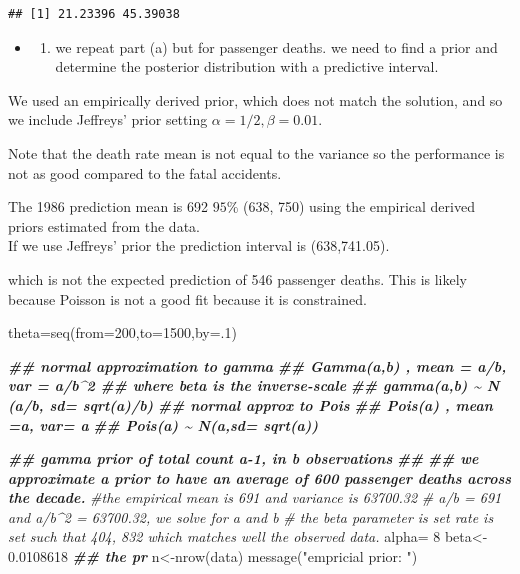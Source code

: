\documentclass[
]{book}
\newenvironment{Shaded}{\begin{snugshade}}{\end{snugshade}}
\newcommand{\AttributeTok}[1]{\textcolor[rgb]{0.77,0.63,0.00}{#1}}
\newcommand{\CommentTok}[1]{\textcolor[rgb]{0.56,0.35,0.01}{\textit{#1}}}
\newcommand{\DecValTok}[1]{\textcolor[rgb]{0.00,0.00,0.81}{#1}}
\newcommand{\DocumentationTok}[1]{\textcolor[rgb]{0.56,0.35,0.01}{\textbf{\textit{#1}}}}
\newcommand{\FloatTok}[1]{\textcolor[rgb]{0.00,0.00,0.81}{#1}}
\newcommand{\FunctionTok}[1]{\textcolor[rgb]{0.00,0.00,0.00}{#1}}
\newcommand{\NormalTok}[1]{#1}
\newcommand{\OtherTok}[1]{\textcolor[rgb]{0.56,0.35,0.01}{#1}}
\newcommand{\StringTok}[1]{\textcolor[rgb]{0.31,0.60,0.02}{#1}}
\providecommand{\tightlist}{%
  \setlength{\itemsep}{0pt}\setlength{\parskip}{0pt}}
\theoremstyle{definition}
\theoremstyle{definition}
\theoremstyle{definition}
\theoremstyle{definition}
\theoremstyle{remark}
\begin{document}
\begin{verbatim}
## [1] 21.23396 45.39038
\end{verbatim}

\begin{itemize}
\item
  \begin{enumerate}
  \def\labelenumi{(\alph{enumi})}
  \setcounter{enumi}{2}
  \tightlist
  \item
    we repeat part (a) but for passenger deaths. we need to find a prior and determine the posterior distribution with a predictive interval.
  \end{enumerate}
\end{itemize}

We used an empirically derived prior, which does not match the solution, and so we include Jeffreys' prior setting \(\alpha=1/2, \beta=0.01\).

Note that the death rate mean is not equal to the variance so the performance is not as good compared to the fatal accidents.

The 1986 prediction mean is 692 \(95\%\) (638, 750) using the empirical derived priors estimated from the data.\\
If we use Jeffreys' prior the prediction interval is (638,741.05).

which is not the expected prediction of 546 passenger deaths. This is likely because Poisson is not a good fit because it is constrained.

\begin{Shaded}
\begin{Highlighting}[]
\NormalTok{ theta}\OtherTok{=}\FunctionTok{seq}\NormalTok{(}\AttributeTok{from=}\DecValTok{200}\NormalTok{,}\AttributeTok{to=}\DecValTok{1500}\NormalTok{,}\AttributeTok{by=}\NormalTok{.}\DecValTok{1}\NormalTok{)}

 \DocumentationTok{\#\# normal approximation to gamma}
  \DocumentationTok{\#\# Gamma(a,b) ,  mean = a/b,  var = a/b\^{}2  \#\# where beta is the inverse{-}scale}
   \DocumentationTok{\#\# gamma(a,b) \textasciitilde{}  N (a/b, sd= sqrt(a)/b)}
 \DocumentationTok{\#\# normal approx to Pois}
   \DocumentationTok{\#\# Pois(a) ,  mean =a, var= a}
    \DocumentationTok{\#\# Pois(a) \textasciitilde{} N(a,sd= sqrt(a))}
 
 \DocumentationTok{\#\# gamma prior of total count a{-}1,  in b observations }
 \DocumentationTok{\#\# }
 \DocumentationTok{\#\# we approximate a prior to have an average of 600 passenger deaths across the decade.  }
\CommentTok{\#the empirical mean is 691 and variance is  63700.32}
\CommentTok{\# a/b =  691  and a/b\^{}2 = 63700.32,  we solve for a and b}
 \CommentTok{\#  the beta parameter is set rate is set such that   404, 832 which matches well the observed data.}
\NormalTok{   alpha}\OtherTok{=} \DecValTok{8}
\NormalTok{   beta}\OtherTok{\textless{}{-}} \FloatTok{0.0108618}
   \DocumentationTok{\#\# the pr}
\NormalTok{   n}\OtherTok{\textless{}{-}}\FunctionTok{nrow}\NormalTok{(data)}
 \FunctionTok{message}\NormalTok{(}\StringTok{"empricial prior: "}\NormalTok{)}
\end{Highlighting}
\end{Shaded}
\end{document}
